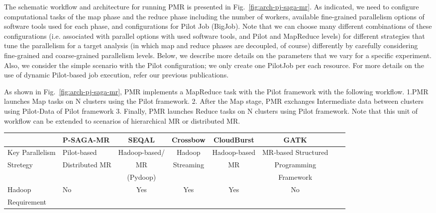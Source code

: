 \documentclass{sig-alternate}
\begin{document}
{The schematic workflow and architecture for running PMR is presented in Fig.~\ref{fig:arch-pj-saga-mr}.  As indicated, we need to configure computational tasks of the map phase and the reduce phase including the number of workers, available fine-grained parallelism options of software tools used for each phase, and configurations for Pilot Job (BigJob).  Note that we can choose many different combinations of these configurations (i.e. associated with parallel options with used software tools, and Pilot and MapReduce levels) for different strategies that tune the parallelism for a target analysis (in which map and reduce phases are decoupled, of course) differently by carefully considering fine-grained and coarse-grained parallelism levels.  Below, we describe more details on the parameters that we vary for a specific experiment.  Also, we consider the simple scenario with the Pilot configuration; we only create one PilotJob per each resource. For more details on the use of dynamic Pilot-based job execution, refer our previous publications\cite{dare-ecmls11,dare-tg11,repex_ptrsa}.    

As shown in Fig.~\ref{fig:arch-pj-saga-mr}, PMR implements a MapReduce task with the Pilot framework\cite{pmr2012} with the following workflow. 1.PMR launches Map tasks on N clusters using the Pilot framework. 2. After the Map stage, PMR exchanges Intermediate data between clusters using Pilot-Data of Pilot framework  3. Finally, PMR launches Reduce tasks on N clusters using Pilot framework.  Note that this unit of workflow can be extended to scenarios of hierarchical MR or distributed MR\cite{pmr2012}.  

\begin{center}
\begin{table}[ht]
{\small
\hfill{}
\begin{tabular}{|l|l|c|c|c|c|c|c|}
\hline
  & \textbf{P-SAGA-MR}\cite{pmr2012} & \textbf{SEQAL}\cite{seal2011} & \textbf{Crossbow}\cite{langmead2009} & \textbf{CloudBurst}\cite{cloudburst} & \textbf{GATK}\cite{gatk} \\ \hline
 \hline 
Key Parallelism   & Pilot-based   &  Hadoop-based/  &  Hadoop   & Hadoop-based & MR-based Structured \\ 
Stretegy  & Distributed MR & MR  & Streaming  & MR & Programming  \\
& & (Pydoop) &  & & Framework  \\ \hline
  
Hadoop & No & Yes & Yes\footnote[1] & Yes & No \\ 
Requirement  & & & &  &\\ \hline  
    

\end{tabular}}
\end{table}
\end{center}}
\end{document}
